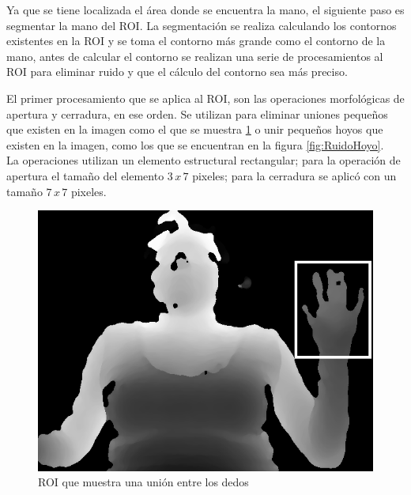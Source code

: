Ya que se tiene localizada el área donde se encuentra la mano, el siguiente paso es segmentar la mano del ROI. La segmentación se realiza calculando los contornos existentes en la ROI y se toma el contorno más grande como el contorno de la mano, antes de calcular el contorno se realizan una serie de procesamientos al ROI para eliminar ruido y que el cálculo del contorno sea más preciso.    

El primer procesamiento que se aplica al ROI, son las operaciones morfológicas de apertura y cerradura, en ese orden. Se utilizan para eliminar uniones pequeños que existen en la imagen como el que se muestra \ref{fig:RuidoUnion} o unir pequeños hoyos que existen en la imagen, como los que se encuentran en la figura \ref{fig:RuidoHoyo}.\\
La operaciones utilizan un elemento estructural rectangular; para la operación de apertura el tamaño del elemento $3 \, x \, 7$ pixeles; para la cerradura se aplic\'o con un tamaño  $7 \, x \, 7$ pixeles. 

\begin{figure}[h!]
\begin{center}
\includegraphics[scale=.5]{./Figures/roi.png}
\end{center}
\caption{ROI que muestra una unión entre los dedos}
\label{fig:RuidoUnion}
\end{figure}   

